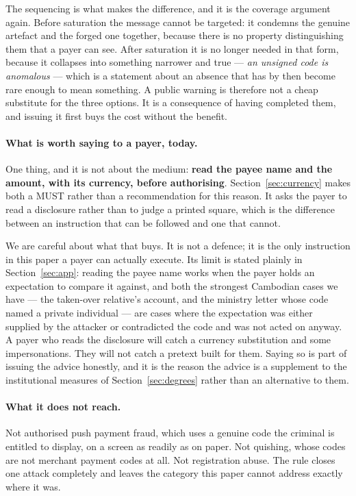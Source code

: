 \documentclass[10pt,a4paper,twocolumn]{article}
\begin{document}
The sequencing is what makes the difference, and it is the coverage argument
again. Before saturation the message cannot be targeted: it condemns the
genuine artefact and the forged one together, because there is no property
distinguishing them that a payer can see. After saturation it is no longer
needed in that form, because it collapses into something narrower and true ---
\emph{an unsigned code is anomalous} --- which is a statement about an absence
that has by then become rare enough to mean something. A public warning is
therefore not a cheap substitute for the three options. It is a consequence of
having completed them, and issuing it first buys the cost without the benefit.

\paragraph{What is worth saying to a payer, today.} One thing, and it is not
about the medium: \textbf{read the payee name and the amount, with its currency,
before authorising}. Section~\ref{sec:currency} makes both a MUST rather than a
recommendation for this reason. It asks the payer to read a disclosure rather
than to judge a printed square, which is the difference between an instruction
that can be followed and one that cannot.

We are careful about what that buys. It is not a defence; it is the only
instruction in this paper a payer can actually execute. Its limit is stated
plainly in Section~\ref{sec:app}: reading the payee name works when the payer
holds an expectation to compare it against, and both the strongest Cambodian
cases we have --- the taken-over relative's account, and the ministry letter
whose code named a private individual --- are cases where the expectation was
either supplied by the attacker or contradicted the code and was not acted on
anyway. A payer who reads the disclosure will catch a currency substitution and
some impersonations. They will not catch a pretext built for them. Saying so is
part of issuing the advice honestly, and it is the reason the advice is a
supplement to the institutional measures of Section~\ref{sec:degrees} rather
than an alternative to them.

\paragraph{What it does not reach.} Not authorised push payment fraud, which
uses a genuine code the criminal is entitled to display, on a screen as readily
as on paper. Not quishing, whose codes are not merchant payment codes at all.
Not registration abuse. The rule closes one attack completely and leaves the
category this paper cannot address exactly where it was.
\end{document}
